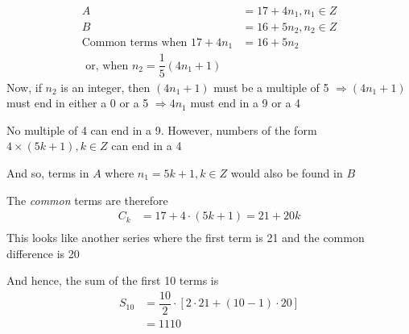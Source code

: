 \begin{solution}
  \begin{align}
  	A &= 17 + 4n_1, n_1 \in Z\\
  	B &= 16 + 5n_2, n_2 \in Z \\
  	\text{Common terms when } 17+4n_1 &= 16+5n_2 \\ 
  	\text{ or, when } n_2 = \dfrac{1}{5}(4n_1 + 1)
  \end{align}
  Now, if $n_2$ is an integer, then $(4n_1+1)$ must be a multiple of 5 $\Rightarrow (4n_1+1)$
  must end in either a 0 or a 5 $\Rightarrow 4n_1$ must end in a 9 or a 4
  
  No multiple of 4 can end in a 9. However, numbers of the form $4\times (5k+1), k \in Z$
  can end in a 4
  
  And so, terms in $A$ where $n_1 = 5k+1, k \in Z$ would also be found in $B$
  
  The \textit{common} terms are therefore
  \begin{align}
  	C_k &= 17 + 4\cdot(5k + 1) = 21 + 20k \\
  \end{align}
  This looks like another series where the first term is 21 and the common difference is 20
  
  And hence, the sum of the first 10 terms is
  \begin{align}
  	S_{10} &= \dfrac{10}{2}\cdot\left[ 2\cdot 21 + (10-1)\cdot 20 \right] \\
  	       &= 1110
  \end{align}
\end{solution} 
